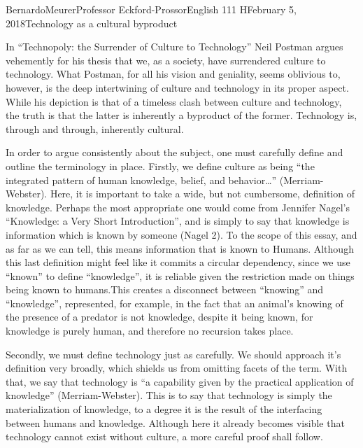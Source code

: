 \documentclass[12pt,letterpaper]{article}
\begin{document}
\begin{mla}{Bernardo}{Meurer}{Professor Eckford-Prossor}{English 111 H}{February 5, 2018}{Technology as a cultural byproduct}

    In ``Technopoly: the Surrender of Culture to Technology'' Neil Postman argues vehemently for his thesis that we, as a society, have surrendered culture to technology. What Postman, for all his vision and geniality, seems oblivious to, however, is the deep intertwining of culture and technology in its proper aspect. While his depiction is that of a timeless clash between culture and technology, the truth is that the latter is inherently a byproduct of the former. Technology is, through and through, inherently cultural.
    
    In order to argue consistently about the subject, one must carefully define and outline the terminology in place. Firstly, we define culture as being ``the integrated pattern of human knowledge, belief, and behavior\ldots'' (Merriam-Webster). Here, it is important to take a wide, but not cumbersome, definition of knowledge. Perhaps the most appropriate one would come from Jennifer Nagel's ``Knowledge: a Very Short Introduction'', and is simply to say that knowledge is information which is known by someone (Nagel 2). To the scope of this essay, and as far as we can tell, this means information that is known to Humans. Although this last definition might feel like it commits a circular dependency, since we use ``known'' to define ``knowledge'', it is reliable given the restriction made on things being known to humans.This creates a disconnect between ``knowing'' and ``knowledge'', represented, for example, in the fact that an animal's knowing of the presence of a predator is not knowledge, despite it being known, for knowledge is purely human, and therefore no recursion takes place.

    Secondly, we must define technology just as carefully. We should approach it's definition very broadly, which shields us from omitting facets of the term. With that, we say that technology is ``a capability given by the practical application of knowledge'' (Merriam-Webster). This is to say that technology is simply the materialization of knowledge, to a degree it is the result of the interfacing between humans and knowledge. Although here it already becomes visible that technology cannot exist without culture, a more careful proof shall follow.


\end{mla}
\end{document}
